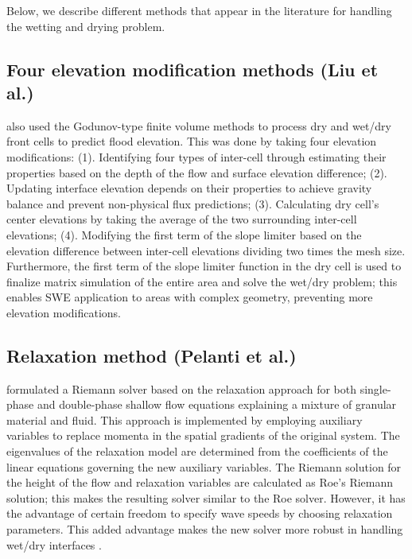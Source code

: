 \documentclass[9pt,a4paper]{article}
\begin{document}
	Below, we describe different methods that appear in the literature for handling the wetting and drying problem.
	
	\subsection{Four elevation modification  methods (Liu et al.)}
	\citet{li-ta-wa-ca-ba-ch-li:2021} also used the Godunov-type finite volume methods to process dry and wet/dry front cells to predict flood elevation. This was done by taking four elevation modifications: (1).  Identifying four types of inter-cell through estimating their properties based on the depth of the flow and surface elevation difference; (2). Updating interface elevation depends on their properties to achieve gravity balance and prevent non-physical flux predictions;  (3).  Calculating dry cell's center elevations by taking the average of the two surrounding inter-cell elevations; (4). Modifying the first term of the slope limiter based on the elevation difference between inter-cell elevations dividing two times the mesh size. Furthermore, the first term of the slope limiter function in the dry cell is used to finalize matrix simulation of the entire area and solve the wet/dry problem; this enables SWE application to areas with complex geometry, preventing more elevation modifications.
	
	\subsection{Relaxation method (Pelanti et al.)}
	
	\citet{pelanti2011riemann} formulated a Riemann solver based on the relaxation approach for both single-phase and double-phase shallow flow equations explaining a mixture of granular material and fluid. This approach is implemented by employing auxiliary variables to replace momenta in the spatial gradients of the original system. The eigenvalues of the relaxation model are determined from the coefficients of the linear equations governing the new auxiliary variables.  The Riemann solution for the height of the flow and relaxation variables are calculated as Roe's Riemann solution; this makes the resulting solver similar to the Roe solver. However, it has the advantage of certain freedom to specify wave speeds by choosing relaxation parameters. This added advantage makes the new solver more robust in handling wet/dry interfaces \citep{pelanti2008relaxation,pelanti2011riemann}.
	
\end{document}
